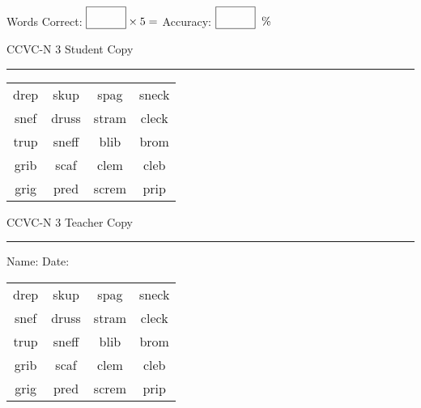 \documentclass{memoir}
\begin{document}
\small

Words Correct: $\fbox{\phantom{\huge 100}} \times 5 = $ Accuracy: $\fbox{\phantom{\huge 100}}\;\; \%$ 

\vfill

\newpage


\footnotesize \noindent
CCVC-N 3 \hfill Student Copy
\smallskip
\hrule

\Large

\setlength{\tabcolsep}{14pt}
\def\arraystretch{3}

{\selectfont


\begin{vplace}[0.5]
\begin{center}
\begin{tabular}{cccc}
drep & skup & spag          & sneck \\
snef & druss & stram & cleck             \\
trup       & sneff & blib             & brom          \\
grib     & scaf & clem & cleb \\
grig      & pred & screm & prip \\
\end{tabular}
\end{center}
\end{vplace}

}

\newpage

\footnotesize \noindent
CCVC-N 3 \hfill Teacher Copy
\smallskip
\hrule

\small

\vfill

\noindent
Name: \underline{\hspace{1.75in}} \hfill Date: \underline{\hspace{1in}}

\Large

{\selectfont


\begin{vplace}[0.5]
\begin{center}
\begin{tabular}{cccc}
drep & skup & spag          & sneck \\
snef & druss & stram & cleck             \\
trup       & sneff & blib             & brom          \\
grib     & scaf & clem & cleb \\
grig      & pred & screm & prip \\
\end{tabular}
\end{center}
\end{vplace}



}
\end{document}
